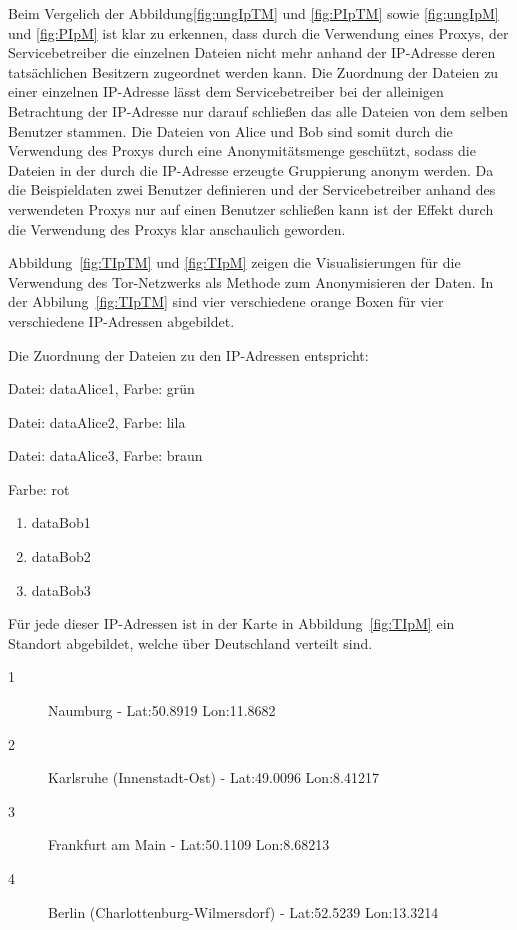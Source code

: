 \documentclass[
    fontsize=12pt,
    headings=small,
    parskip=half,           %
    bibliography=totoc,
    numbers=noenddot,       %
    open=any,               %
    ]{scrreprt}
\begin{document}
Beim Vergelich der Abbildung\ref{fig:ungIpTM} und \ref{fig:PIpTM} sowie \ref{fig:ungIpM} und \ref{fig:PIpM} ist klar zu erkennen, dass durch die Verwendung eines Proxys, der Servicebetreiber die einzelnen Dateien nicht mehr anhand der IP-Adresse deren tatsächlichen Besitzern zugeordnet werden kann.
Die Zuordnung der Dateien zu einer einzelnen IP-Adresse lässt dem Servicebetreiber bei der alleinigen Betrachtung der IP-Adresse nur darauf schließen das alle Dateien von dem selben Benutzer stammen.
Die Dateien von Alice und Bob sind somit durch die Verwendung des Proxys durch eine Anonymitätsmenge geschützt, sodass die Dateien in der durch die IP-Adresse erzeugte Gruppierung anonym werden.
Da die Beispieldaten zwei Benutzer definieren und der Servicebetreiber anhand des verwendeten Proxys nur auf einen Benutzer schließen kann ist der Effekt durch die Verwendung des Proxys klar anschaulich geworden. 

Abbildung~\ref{fig:TIpTM} und \ref{fig:TIpM} zeigen die Visualisierungen für die Verwendung des Tor-Netzwerks als Methode zum Anonymisieren der Daten.
In der Abbilung~\ref{fig:TIpTM} sind vier verschiedene orange Boxen für vier verschiedene IP-Adressen abgebildet.

Die Zuordnung der Dateien zu den IP-Adressen entspricht:
\begin{description}[style=nextline]
\item[203.0.113.1] Datei: dataAlice1, Farbe: grün
\item[203.113.5] Datei: dataAlice2, Farbe: lila
\item[203.0.113.13] Datei: dataAlice3, Farbe: braun
\item[203.0.113.2] Farbe: rot
\begin{enumerate}
\item dataBob1
\item dataBob2
\item dataBob3
\end{enumerate}
\end{description}

Für jede dieser IP-Adressen ist in der Karte in Abbildung~\ref{fig:TIpM} ein Standort abgebildet, welche über Deutschland verteilt sind. 
\begin{description}
\item[1] Naumburg - \ac{Lat}:50.8919 \ac{Lon}:11.8682
\item[2] Karlsruhe (Innenstadt-Ost) - \ac{Lat}:49.0096 \ac{Lon}:8.41217
\item[3] Frankfurt am Main - \ac{Lat}:50.1109 \ac{Lon}:8.68213
\item[4] Berlin (Charlottenburg-Wilmersdorf) - \ac{Lat}:52.5239 \ac{Lon}:13.3214
\end{description}
\end{document}
